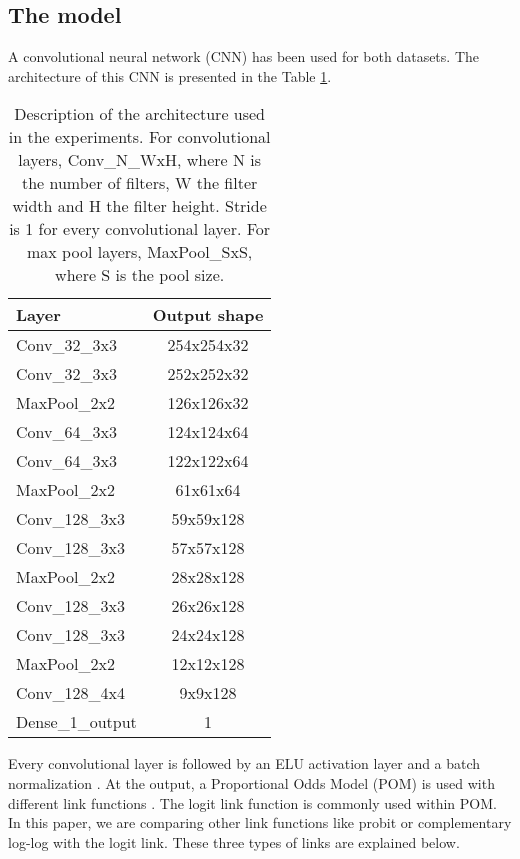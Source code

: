 \documentclass[10pt, a4paper, titlepage]{article}
\begin{document}
\begin{multicols}{2}
	\subsection{The model}
	A convolutional neural network (CNN) has been used for both datasets. The architecture of this CNN is presented in the Table \ref{table:CNNArchitecture}.
	
	\begin{table}[H]
		\centering
		\begin{tabular}{|l|c|}
			\hline
			\textbf{Layer} & \textbf{Output shape}\\
			\hline
			Conv\_32\_3x3 & 254x254x32\\\hline
			Conv\_32\_3x3 & 252x252x32\\\hline
			MaxPool\_2x2 & 126x126x32\\\hline
			
			Conv\_64\_3x3 & 124x124x64\\\hline
			Conv\_64\_3x3 & 122x122x64\\\hline
			MaxPool\_2x2 & 61x61x64\\\hline
			
			Conv\_128\_3x3 & 59x59x128\\\hline
			Conv\_128\_3x3 & 57x57x128\\\hline
			MaxPool\_2x2 & 28x28x128\\\hline
			
			Conv\_128\_3x3 & 26x26x128\\\hline
			Conv\_128\_3x3 & 24x24x128\\\hline
			MaxPool\_2x2 & 12x12x128\\\hline
			
			Conv\_128\_4x4 & 9x9x128\\\hline
			Dense\_1\_output & 1\\
			\hline
		\end{tabular}
		\caption{Description of the architecture used in the experiments. For convolutional layers, Conv\_N\_WxH, where N is the number of filters, W the filter width and H the filter height. Stride is 1 for every convolutional layer. For max pool layers, MaxPool\_SxS, where S is the pool size.}
		\label{table:CNNArchitecture}
	\end{table}
	
	Every convolutional layer is followed by an ELU activation layer \cite{clevert2015fast} and a batch normalization \cite{ioffe2015batch}. At the output, a Proportional Odds Model (POM) is used with different link functions \cite{agresti2010analysis}. The logit link function is commonly used within POM. In this paper, we are comparing other link functions like probit or complementary log-log with the logit link. These three types of links are explained below.
	

\end{multicols}
\end{document}
